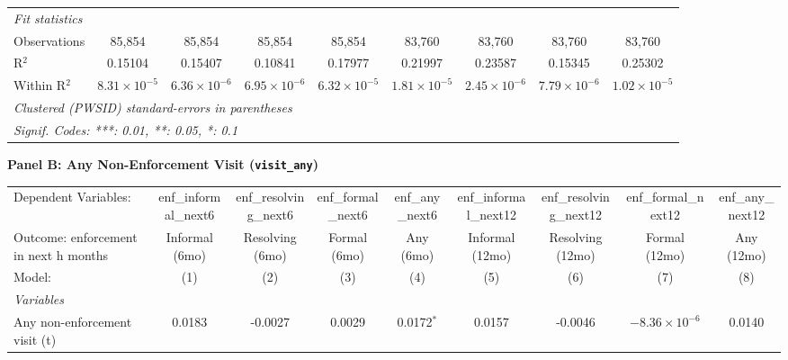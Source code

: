 \begin{table}[htbp]
\begin{tabular}{lcccccccc}
   \midrule
   \emph{Fit statistics}\\
   Observations                          & 85,854                 & 85,854                  & 85,854                & 85,854                & 83,760                  & 83,760                   & 83,760                & 83,760\\  
   R$^2$                                 & 0.15104                & 0.15407                 & 0.10841               & 0.17977               & 0.21997                 & 0.23587                  & 0.15345               & 0.25302\\  
   Within R$^2$                          & $8.31\times 10^{-5}$   & $6.36\times 10^{-6}$    & $6.95\times 10^{-6}$  & $6.32\times 10^{-5}$  & $1.81\times 10^{-5}$    & $2.45\times 10^{-6}$     & $7.79\times 10^{-6}$  & $1.02\times 10^{-5}$\\   
   \midrule \midrule
   \multicolumn{9}{l}{\emph{Clustered (PWSID) standard-errors in parentheses}}\\
   \multicolumn{9}{l}{\emph{Signif. Codes: ***: 0.01, **: 0.05, *: 0.1}}\\
\end{tabular}
\par\endgroup
\vspace{8pt}
\textbf{Panel B: Any Non-Enforcement Visit (\texttt{visit\_any})}\\[4pt]
\begingroup
\centering
\begin{tabular}{lcccccccc}
   \tabularnewline \midrule \midrule
   Dependent Variables:                  & enf\_informal\_next6   & enf\_resolving\_next6   & enf\_formal\_next6    & enf\_any\_next6       & enf\_informal\_next12   & enf\_resolving\_next12   & enf\_formal\_next12    & enf\_any\_next12\\    
   Outcome: enforcement in next h months & Informal (6mo)         & Resolving (6mo)         & Formal (6mo)          & Any (6mo)             & Informal (12mo)         & Resolving (12mo)         & Formal (12mo)          & Any (12mo) \\   
   Model:                                & (1)                    & (2)                     & (3)                   & (4)                   & (5)                     & (6)                      & (7)                    & (8)\\  
   \midrule
   \emph{Variables}\\
   Any non-enforcement visit (t)         & 0.0183                 & -0.0027                 & 0.0029                & 0.0172$^{*}$          & 0.0157                  & -0.0046                  & $-8.36\times 10^{-6}$  & 0.0140\\   

\end{tabular}
\end{table}
